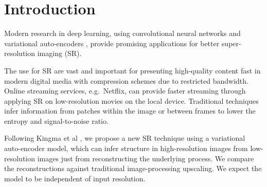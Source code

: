 \section{Introduction}
\label{sec:introduction}
Modern research in deep learning, using convolutional neural networks \cite{Dong15} and variational auto-encoders \cite{Kingma2013, Johnson16}, provide promising applications for better super-resolution imaging (SR).  

The use for SR are vast and important for presenting high-quality content fast in modern digital media with compression schemes due to restricted bandwidth. Online streaming services, e.g.\ Netflix, can provide faster streaming through applying SR on low-resolution movies on the local device. Traditional techniques infer information from patches within the image or between frames to lower the entropy and signal-to-noise ratio. 

Following Kingma et al \cite{Kingma2013}, we propose a new SR technique using a variational auto-encoder model, which can infer structure in high-resolution images from low-resolution images just from reconstructing the underlying process. We compare the reconstructions against traditional image-processing upscaling. We expect the model to be independent of input resolution.
